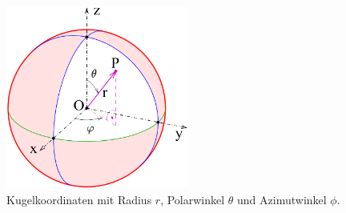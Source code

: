 \begin{figure}
	\centering
	\includegraphics[width=6cm]{papers/geodaeten/Abbildungen/Linienelemente/LinKugel1}
	\caption{Kugelkoordinaten mit Radius $r$, Polarwinkel $\theta$ und Azimutwinkel $\phi$. \cite{geodaeten:Kugelkoordinaten}}
	\label{geodaeten:figure:Linienelemente:Kugelkoordinaten:Kugelkoordinaten}
\end{figure}

